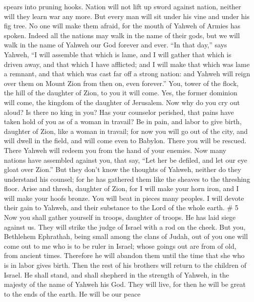 spears into pruning hooks. Nation will not lift up sword against nation,
neither will they learn war any more.  But every man will
sit under his vine and under his fig tree. No one will make them afraid,
for the mouth of Yahweh of Armies has spoken.  Indeed all
the nations may walk in the name of their gods, but we will walk in the
name of Yahweh our God forever and ever.  ``In that day,''
says Yahweh, ``I will assemble that which is lame, and I will gather
that which is driven away, and that which I have afflicted; 
and I will make that which was lame a remnant, and that which was cast
far off a strong nation: and Yahweh will reign over them on Mount Zion
from then on, even forever.''  You, tower of the flock, the
hill of the daughter of Zion, to you it will come. Yes, the former
dominion will come, the kingdom of the daughter of Jerusalem.
 Now why do you cry out aloud? Is there no king in you? Has
your counselor perished, that pains have taken hold of you as of a woman
in travail?  Be in pain, and labor to give birth, daughter
of Zion, like a woman in travail; for now you will go out of the city,
and will dwell in the field, and will come even to Babylon. There you
will be rescued. There Yahweh will redeem you from the hand of your
enemies.  Now many nations have assembled against you, that
say, ``Let her be defiled, and let our eye gloat over Zion.''
 But they don't know the thoughts of Yahweh, neither do
they understand his counsel; for he has gathered them like the sheaves
to the threshing floor.  Arise and thresh, daughter of
Zion, for I will make your horn iron, and I will make your hoofs bronze.
You will beat in pieces many peoples. I will devote their gain to
Yahweh, and their substance to the Lord of the whole earth. \# 5
 Now you shall gather yourself in troops, daughter of
troops. He has laid siege against us. They will strike the judge of
Israel with a rod on the cheek.  But you, Bethlehem
Ephrathah, being small among the clans of Judah, out of you one will
come out to me who is to be ruler in Israel; whose goings out are from
of old, from ancient times.  Therefore he will abandon them
until the time that she who is in labor gives birth. Then the rest of
his brothers will return to the children of Israel.  He
shall stand, and shall shepherd in the strength of Yahweh, in the
majesty of the name of Yahweh his God. They will live, for then he will
be great to the ends of the earth.  He will be our peace
